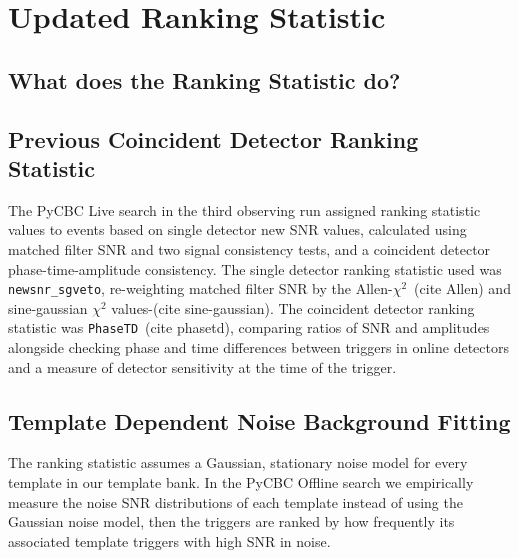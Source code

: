 

\section{Updated Ranking Statistic}

\subsection{What does the Ranking Statistic do?}

\subsection{Previous Coincident Detector Ranking Statistic}

The PyCBC Live search in the third observing run assigned ranking statistic values to events based on single detector new SNR values, calculated using matched filter SNR and two signal consistency tests, and a coincident detector phase-time-amplitude consistency. The single detector ranking statistic used was \verb|newsnr_sgveto|, re-weighting matched filter SNR by the Allen-$\chi^{2}$~(cite Allen) and sine-gaussian $\chi^{2}$ values-(cite sine-gaussian). The coincident detector ranking statistic was \verb|PhaseTD|~(cite phasetd), comparing ratios of SNR and amplitudes alongside checking phase and time differences between triggers in online detectors and a measure of detector sensitivity at the time of the trigger.

\subsection{Template Dependent Noise Background Fitting}
The ranking statistic assumes a Gaussian, stationary noise model for every template in our template bank. In the PyCBC Offline search we empirically measure the noise SNR distributions of each template instead of using the Gaussian noise model, then the triggers are ranked by how frequently its associated template triggers with high SNR in noise.

